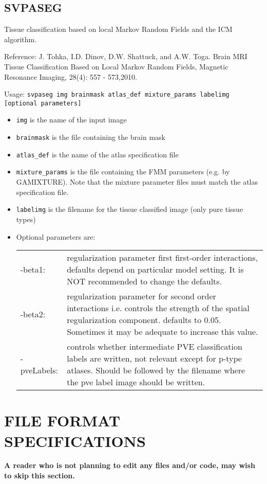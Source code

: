 \documentclass[12pt]{article}
\begin{document}
\subsection{SVPASEG}

Tissue classification based on local Markov Random Fields and the ICM
algorithm.

Reference: J. Tohka, I.D. Dinov, D.W. Shattuck, and A.W. Toga. Brain MRI Tissue Classification Based on Local Markov Random Fields, Magnetic Resonance Imaging, 28(4): 557 - 573,2010. 

Usage: {\tt svpaseg img brainmask atlas\_def mixture\_params labelimg [optional parameters]}

\begin{itemize}
\item {\tt img} is the name of the input image 
\item {\tt brainmask} is the file containing the brain mask
\item {\tt  atlas\_def} is the name of the atlas specification file
\item  {\tt mixture\_params} is the file containing the FMM parameters (e.g. by
GAMIXTURE). Note that the mixture parameter files must match the atlas
specification file.
\item {\tt labelimg} is the filename for the tissue classified image (only pure
tissue types)
\item  Optional parameters are: \\
\begin{tabular}{l p{10cm}}
-beta1:      &       regularization parameter first first-order interactions,
                    defaults depend on particular model setting.
                    It is NOT recommended to change the defaults. \\
-beta2:       &      regularization parameter for second order interactions
                    i.e. controls the strength of the spatial regularization component. 
                    defaults to 0.05. Sometimes it may be adequate to increase this value. \\
-pveLabels:    &     controls whether intermediate PVE classification labels are written,
                     not relevant except for p-type atlases.  Should be followed by the filename where the pve label image should be written. \\ 
\end{tabular}
\end{itemize} 


\section{FILE FORMAT SPECIFICATIONS}
{\bf A reader who is not planning to edit any files and/or code, may wish to skip this section.}
\end{document}
